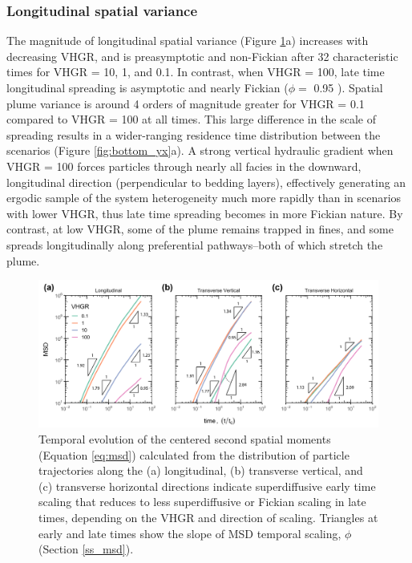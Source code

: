 \subsubsection{Longitudinal spatial variance}
\label{ss_3_2a}
The magnitude of longitudinal spatial variance (Figure \ref{fig:msd}a) increases with decreasing VHGR, and is preasymptotic and non-Fickian after 32 characteristic times for VHGR = 10, 1, and 0.1. In contrast, when VHGR = 100, late time longitudinal spreading is asymptotic and nearly Fickian ($\phi = $ 0.95 ). Spatial plume variance is around 4 orders of magnitude greater for VHGR = 0.1 compared to VHGR = 100 at all times. This large difference in the scale of spreading results in a wider-ranging residence time distribution between the scenarios (Figure \ref{fig:bottom_yx}a). A strong vertical hydraulic gradient when VHGR = 100 forces particles through nearly all facies in the downward, longitudinal direction (perpendicular to bedding layers), effectively generating an ergodic sample of the system heterogeneity much more rapidly than in scenarios with lower VHGR, thus late time spreading becomes in more Fickian nature. By contrast, at low VHGR, some of the plume remains trapped in fines, and some spreads longitudinally along preferential pathways--both of which stretch the plume.

\begin{figure}[H]
  \includegraphics[width=\textwidth]{ch4_figs/msd_time_2amean_ta1_ai.pdf}
  \caption{Temporal evolution of the centered second spatial moments (Equation \ref{eq:msd}) calculated from the distribution of particle trajectories along the (a) longitudinal, (b) transverse vertical, and (c) transverse horizontal directions indicate superdiffusive early time scaling that reduces to less superdiffusive or Fickian scaling in late times, depending on the VHGR and direction of scaling. Triangles at early and late times show the slope of MSD temporal scaling, $\phi$ (Section \ref{ss_msd}).}
  \label{fig:msd}
\end{figure}


